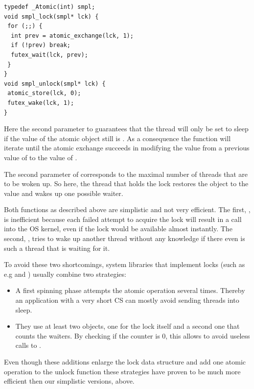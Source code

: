 \lstset{language=C11,label= ,caption= ,numbers=none}
\begin{lstlisting}
typedef _Atomic(int) smpl;
void smpl_lock(smpl* lck) {
 for (;;) {
  int prev = atomic_exchange(lck, 1);
  if (!prev) break;
  futex_wait(lck, prev);
 }
}
void smpl_unlock(smpl* lck) {
 atomic_store(lck, 0);
 futex_wake(lck, 1);
}
\end{lstlisting}

\iflong%
Here the second parameter to  guarantees that the thread
will only be set to sleep if the value of the atomic object 
still is . As a consequence the  function will iterate until the
atomic exchange succeeds in modifying the value from a previous
value of  to the value of .

The second parameter of  corresponds to the maximal
number of threads that are to be woken up. So here, the thread that
holds the lock restores the object  to the value  and wakes
up one possible waiter.
\fi

Both functions as described above are simplistic and not very
efficient. The first, , is inefficient because each failed
attempt to acquire the lock will result in a call into the OS
kernel, even if the lock would be available almost instantly.  The
second, , tries to wake up another thread without any
knowledge if there even is such a thread that is waiting for it.

To avoid these two shortcomings, system libraries that implement
locks (such as e.g  and ) usually combine two
strategies:\itemadjust

\begin{itemize}
\item A first spinning phase attempts the atomic operation several
times. Thereby an application with a very short CS can mostly
avoid sending threads into sleep.\itemadjust

\item They use at least two  objects, one for the lock itself
and a second one that counts the waiters. By checking if the
counter is 0, this allows to avoid useless calls to
.\itemadjust
\end{itemize}

\iflong
Even though these additions enlarge the lock data structure and add
one atomic operation to the unlock function these strategies have
proven to be much more efficient then our simplistic versions,
above.
\fi

